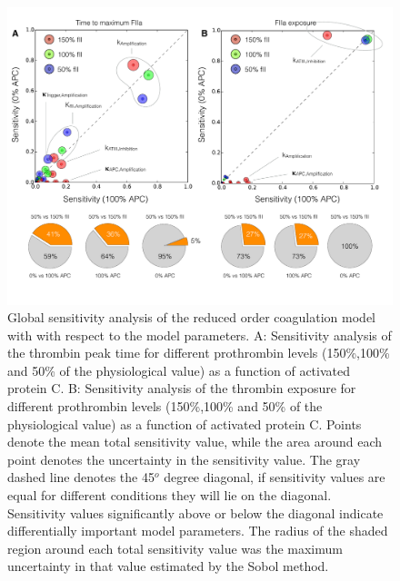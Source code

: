\documentclass[12pt]{article}
\begin{document}
\begin{figure}
\centering
\includegraphics[width=1.0\textwidth]{./figs/Figure-9-Sensitivity.pdf}
\caption{Global sensitivity analysis of the reduced order coagulation model with with respect to the model parameters.
A: Sensitivity analysis of the thrombin peak time for different prothrombin levels (150\%,100\% and 50\% of the physiological value) as a function of activated protein C. 
B: Sensitivity analysis of the thrombin exposure for different prothrombin levels (150\%,100\% and 50\% of the physiological value) as a function of activated protein C. 
Points denote the mean total sensitivity value, while the area around each point denotes the uncertainty in the sensitivity value. 
The gray dashed line denotes the 45$^{o}$ degree diagonal, if sensitivity values are equal for different conditions they will lie on the diagonal.  
Sensitivity values significantly above or below the diagonal indicate differentially important model parameters. 
The radius of the shaded region around each total sensitivity value was the maximum uncertainty in that value estimated by the Sobol method. 
}\label{fig-sensitivity}
\end{figure}

\clearpage

\renewcommand\thefigure{S\arabic{figure}}
\renewcommand\thetable{T\arabic{table}}
\renewcommand\thepage{S-\arabic{page}}
\renewcommand\theequation{S\arabic{equation}}

\setcounter{equation}{0}
\setcounter{table}{0}
\setcounter{figure}{0}
\setcounter{page}{1}
\end{document}
